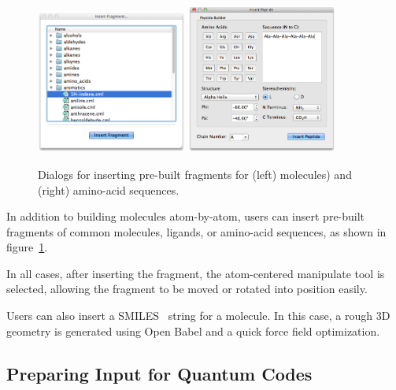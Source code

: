 \documentclass[10pt]{bmc_article}
\newenvironment{bmcformat}{\begin{raggedright}
\baselineskip20pt\sloppy\setboolean{publ}{false}}{\end{raggedright}
\baselineskip20pt\sloppy}
\begin{document}
\begin{bmcformat}
\begin{figure}
  \includegraphics[width=0.44\textwidth]{images/insert-fragment}
  \hspace{0.1cm}
  \includegraphics[width=0.44\textwidth]{images/insert-peptide}
  \caption{Dialogs for inserting pre-built fragments for (left)
    molecules) and (right) amino-acid sequences.}
  \label{f:insertdialogs}
\end{figure}

In addition to building molecules atom-by-atom, users can insert
pre-built fragments of common molecules, ligands, or amino-acid
sequences, as shown in figure~\ref{f:insertdialogs}.

In all cases, after inserting the fragment, the atom-centered manipulate tool
is selected, allowing the fragment to be moved or rotated into
position easily.

Users can also insert a SMILES~\cite{smiles} string for a molecule. In
this case, a rough 3D geometry is generated using Open Babel and a
quick force field optimization.

\subsection{Preparing Input for Quantum Codes}


\end{bmcformat}
\end{document}
